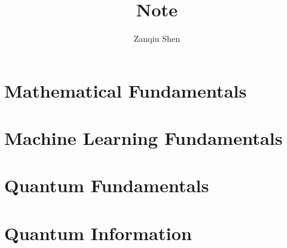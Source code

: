 \documentclass[a4paper,11pt,openany]{book}
\begin{document}
\title{\textbf{Note}}
\author{Zanqiu Shen}
\maketitle
%
\tableofcontents

\setcounter{chapter}{0}
\part{Mathematical Fundamentals}




\part{Machine Learning Fundamentals}


\part{Quantum Fundamentals}




\part{Quantum Information}




\newpage
%
%
\end{document}
